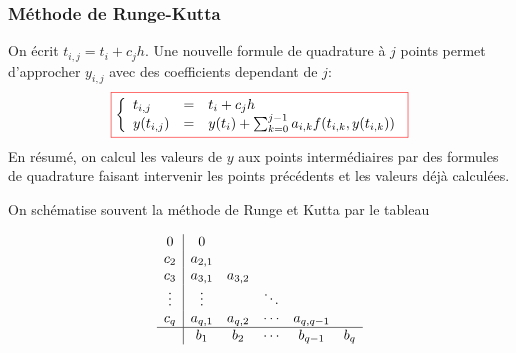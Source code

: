 \documentclass{beamer}
\newcommand{\myredbox}[1]{\fcolorbox{red}{white}{$\displaystyle#1$}}
\begin{document}
\begin{frame}
 \frametitle{Méthode de Runge-Kutta}

On écrit $t_{i,j}=t_i+c_jh$. Une nouvelle formule de quadrature à $j$ points permet d'approcher $y_{i,j}$ avec des coefficients dependant de $j$:
\[\myredbox{\left\{\begin{array}{lll}
t_{i,j}&=&t_i+c_jh\\
y(t_{i,j})&=&y(t_i)+\sum_{k=0}^{j-1} a_{i,k}f(t_{i,k},y(t_{i,k}))
\end{array}\right.} \]
En résumé, on calcul les valeurs de $y$ aux points intermédiaires par des formules de quadrature faisant intervenir les points précédents et les valeurs déjà calculées.

On schématise souvent la méthode de Runge et Kutta par le tableau

\[\begin{array}{c|cccccc}
0&0&&&&\\
c_2&a_{2,1}&&&&\\
c_3&a_{3,1}&a_{3,2}&&&\\
\vdots&\vdots&&\ddots& &\\
c_q&a_{q,1}&a_{q,2}&\cdots&a_{q,q-1}&\\ \hline
&b_{1}&b_{2}&\cdots&b_{q-1}&b_{q}
\end{array}\]
\end{frame}        
      
\end{document}
